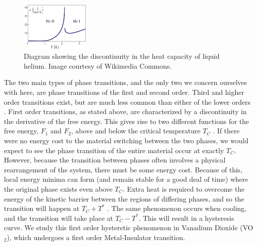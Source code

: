 \documentclass[%
 reprint,
 amsmath,amssymb,
 aps,
 pra,
]{revtex4-1}
\begin{document}
\begin{figure}[H]
	\centering
	\includegraphics[width=0.3\textwidth]{lambda.png}
	\caption{Diagram showing the discontinuity in the heat capacity of liquid helium. Image courtesy of Wikimedia Commons.}
	\label{fig:lambda_point_helium}
\end{figure}

The two main types of phase transitions, and the only two we concern ourselves with here, are phase transitions of the first and second order. Third and higher order transitions exist, but are much less common than either of the lower orders \cite{thirdorder}. First order transitions, as stated above, are characterized by a discontinuity in the derivative of the free energy. This gives rise to two different functions for the free energy, $F_1$ and $F_2$, above and below the critical temperature $T_C$ \cite{manual, physics_of_phase}. If there were no energy cost to the material switching between the two phases, we would expect to see the phase transition of the entire material occur at exactly $T_C$. However, because the transition between phases often involves a physical rearrangement of the system, there must be some energy cost. Because of this, local energy minima can form (and remain stable for a good deal of time) where the original phase exists even above $T_C$. Extra heat is required to overcome the energy of the kinetic barrier between the regions of differing phases, and so the transition will happen at $T_C + T^*$ \cite{manual}. The same phenomenon occurs when cooling, and the transition will take place at $T_C - T^*$. This will result in a hysteresis curve. We study this first order hysteretic phenomenon in Vanadium Dioxide (VO$_2$), which undergoes a first order Metal-Insulator transition.
\end{document}
